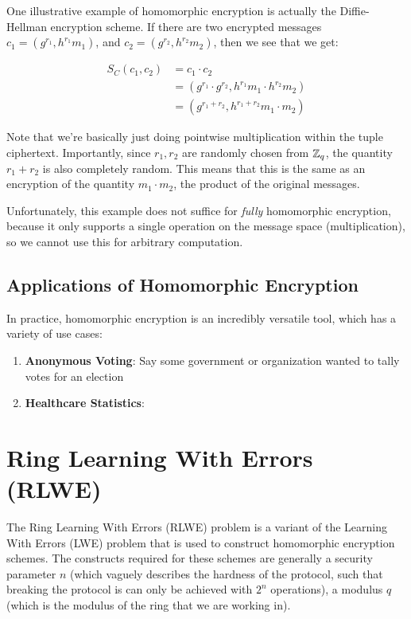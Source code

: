 \documentclass{theme}
\begin{document}
One illustrative example of homomorphic encryption is actually the Diffie-Hellman encryption scheme. If there are two encrypted messages $c_1 = (g^{r_1}, h^{r_1} m_1)$, and $c_2 = (g^{r_2}, h^{r_2} m_2)$, then we see that we get:

\begin{align}
    S_C(c_1, c_2) & = c_1 \cdot c_2                                          \\
                  & = (g^{r_1} \cdot g^{r_2}, h^{r_1} m_1 \cdot h^{r_2} m_2) \\
                  & = (g^{r_1 + r_2}, h^{r_1 + r_2} m_1 \cdot m_2)
\end{align}

Note that we're basically just doing pointwise multiplication within the tuple ciphertext. Importantly, since $r_1, r_2$ are randomly chosen from $\mathbb{Z}_q$, the quantity $r_1 + r_2$ is also completely random. This means that this is the same as an encryption of the quantity $m_1 \cdot m_2$, the product of the original messages.

Unfortunately, this example does not suffice for \textit{fully} homomorphic encryption, because it only supports a single operation on the message space (multiplication), so we cannot use this for arbitrary computation.

\subsection{Applications of Homomorphic Encryption}

In practice, homomorphic encryption is an incredibly versatile tool, which has a variety of use cases:

\begin{enumerate}
    \item \textbf{Anonymous Voting}: Say some government or organization wanted to tally votes for an election
    \item \textbf{Healthcare Statistics}:
\end{enumerate}

\section{Ring Learning With Errors (RLWE)}

The Ring Learning With Errors (RLWE) problem is a variant of the Learning With Errors (LWE) problem that is used to construct homomorphic encryption schemes. The constructs required for these schemes are generally a security parameter $n$ (which vaguely describes the hardness of the protocol, such that breaking the protocol is can only be achieved with $2^n$ operations), a modulus $q$ (which is the modulus of the ring that we are working in).
\end{document}

